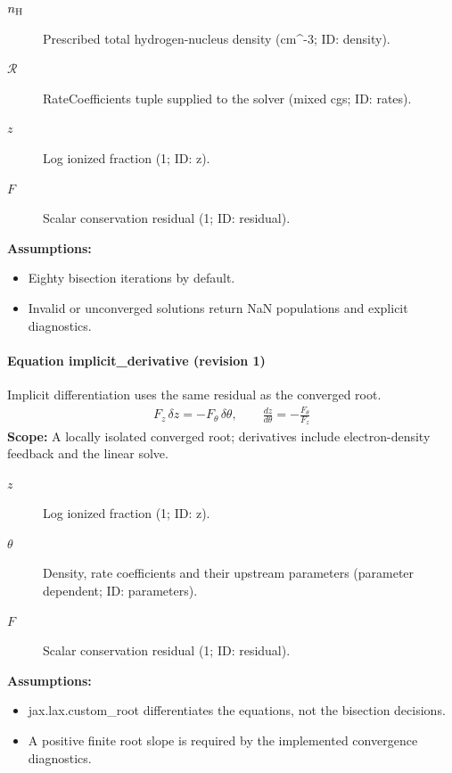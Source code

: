 \begin{description}
\item[$n_{\rm H}$] Prescribed total hydrogen-nucleus density (cm\textasciicircum{}-3; ID: density).
\item[$\mathcal R$] RateCoefficients tuple supplied to the solver (mixed cgs; ID: rates).
\item[$z$] Log ionized fraction (1; ID: z).
\item[$F$] Scalar conservation residual (1; ID: residual).
\end{description}

\noindent\textbf{Assumptions:}
\begin{itemize}
\item Eighty bisection iterations by default.
\item Invalid or unconverged solutions return NaN populations and explicit diagnostics.
\end{itemize}

\paragraph{Equation implicit\_derivative (revision 1)}
Implicit differentiation uses the same residual as the converged root.
\begin{equation}
\begin{aligned}
F_z\,\delta z=-F_\theta\,\delta\theta,\qquad \frac{dz}{d\theta}=-\frac{F_\theta}{F_z}
\end{aligned}
\label{eq:escape.hydrogen_5f_nlte:implicit_5f_derivative:1}
\end{equation}
\noindent\textbf{Scope:} A locally isolated converged root; derivatives include electron-density feedback and the linear solve.

\begin{description}
\item[$z$] Log ionized fraction (1; ID: z).
\item[$\theta$] Density, rate coefficients and their upstream parameters (parameter dependent; ID: parameters).
\item[$F$] Scalar conservation residual (1; ID: residual).
\end{description}

\noindent\textbf{Assumptions:}
\begin{itemize}
\item jax.lax.custom\_root differentiates the equations, not the bisection decisions.
\item A positive finite root slope is required by the implemented convergence diagnostics.
\end{itemize}


